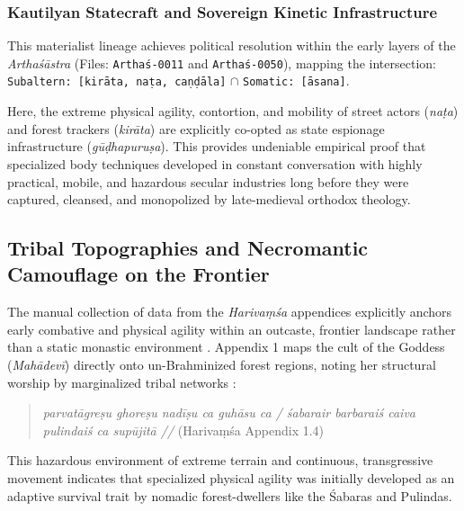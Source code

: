 \documentclass[11pt,twoside,letterpaper]{article}
\begin{document}
\subsubsection{Kautilyan Statecraft and Sovereign Kinetic Infrastructure}
This materialist lineage achieves political resolution within the early layers of the \textit{Arthaśāstra} (Files: \texttt{Arthaś-0011} and \texttt{Arthaś-0050}), mapping the intersection: \texttt{Subaltern: [kirāta, naṭa, caṇḍāla]} $\cap$ \texttt{Somatic: [āsana]}. 

Here, the extreme physical agility, contortion, and mobility of street actors (\textit{naṭa}) and forest trackers (\textit{kirāta}) are explicitly co-opted as state espionage infrastructure (\textit{gūḍhapuruṣa}). This provides undeniable empirical proof that specialized body techniques developed in constant conversation with highly practical, mobile, and hazardous secular industries long before they were captured, cleansed, and monopolized by late-medieval orthodox theology.

\subsection{Tribal Topographies and Necromantic Camouflage on the Frontier}
The manual collection of data from the \textit{Harivaṃśa} appendices explicitly anchors early combative and physical agility within an outcaste, frontier landscape rather than a static monastic environment \citep{McCartney2026}. Appendix 1 maps the cult of the Goddess (\textit{Mahādevī}) directly onto un-Brahminized forest regions, noting her structural worship by marginalized tribal networks \citep{HV_App}:
\begin{quote}
\textit{parvatāgreṣu ghoreṣu nadīṣu ca guhāsu ca / śabarair barbaraiś caiva pulindaiś ca supūjitā //} (Harivaṃśa Appendix 1.4)
\end{quote}
This hazardous environment of extreme terrain and continuous, transgressive movement indicates that specialized physical agility was initially developed as an adaptive survival trait by nomadic forest-dwellers like the Śabaras and Pulindas.
\end{document}
